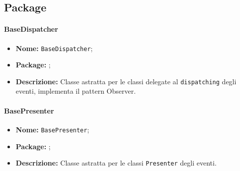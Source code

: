 \subsection{Package \logic{}}

\paragraph{BaseDispatcher}
\begin{flushleft}
\begin{itemize}
\item \textbf{Nome:} \texttt{BaseDispatcher};
\item \textbf{Package:} \texttt{\logic{}};
\item \textbf{Descrizione:} Classe astratta per le classi delegate al \texttt{dispatching} degli eventi, implementa il pattern Observer.
\end{itemize}
\end{flushleft}

\paragraph{BasePresenter}
\begin{flushleft}
\begin{itemize}
\item \textbf{Nome:} \texttt{BasePresenter};
\item \textbf{Package:} \texttt{\logic{}};
\item \textbf{Descrizione:} Classe astratta per le classi \texttt{Presenter} degli eventi.
\end{itemize}
\end{flushleft}

